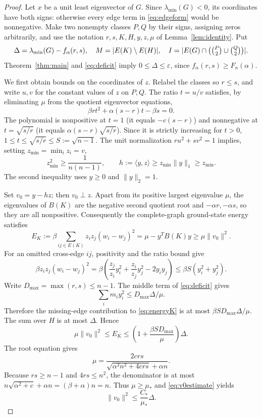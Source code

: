 \documentclass[11pt]{amsart}
\theoremstyle{definition}
\newcommand{\lam}{\lambda_{\min}}
\begin{document}
\begin{proof}
Let $x$ be a unit least eigenvector of $G$. Since $\lam(G)<0$, its coordinates have both signs: otherwise every edge term in \eqref{eq:edgeform} would be nonnegative. Make two nonempty classes $P,Q$ by their signs, assigning zeros arbitrarily, and use the notation $r,s,K,H,y,z,\mu$ of Lemma~\ref{lem:identity}. Put
\[
 \Delta=\lam(G)-f_\alpha(r,s),\quad
 M=|E(K)\setminus E(H)|,
 \quad I=|E(G)\cap\bigl(\tbinom P2\cup\tbinom Q2\bigr)|.
\]
Theorem~\ref{thm:main} and \eqref{eq:deficit} imply $0\le\Delta\le\varepsilon$, since $f_\alpha(r,s)\ge F_n(\alpha)$.

We first obtain bounds on the coordinates of $z$. Relabel the classes so $r\le s$, and write $u,v$ for the constant values of $z$ on $P,Q$. The ratio $t=u/v$ satisfies, by eliminating $\mu$ from the quotient eigenvector equations,
\[
 \beta rt^2+\alpha(s-r)t-\beta s=0.
\]
The polynomial is nonpositive at $t=1$ (it equals $-c(s-r)$) and nonnegative at $t=\sqrt{s/r}$ (it equals $\alpha(s-r)\sqrt{s/r}$). Since it is strictly increasing for $t>0$, $1\le t\le\sqrt{s/r}\le S:=\sqrt{n-1}$. The unit normalization $ru^2+sv^2=1$ implies, setting $z_{\min}=\min_i z_i=v$,
\begin{equation}\label{eq:zmin}
 z_{\min}^2\ge\frac1{n(n-1)},
 \qquad h:=\langle y,z\rangle\ge z_{\min}\|y\|_1\ge z_{\min}.
\end{equation}
The second inequality uses $y\ge0$ and $\|y\|_2=1$.

Set $v_0=y-hz$; then $v_0\perp z$. Apart from its positive largest eigenvalue $\mu$, the eigenvalues of $B(K)$ are the negative second quotient root and $-\alpha r,-\alpha s$, so they are all nonpositive. Consequently the complete-graph ground-state energy satisfies
\begin{equation}\label{eq:energyK}
 E_K:=\beta\sum_{ij\in E(K)}z_iz_j(w_i-w_j)^2
 =\mu-y^TB(K)y\ge\mu\|v_0\|^2.
\end{equation}
For an omitted cross-edge $ij$, positivity and the ratio bound give
\[
 \beta z_iz_j(w_i-w_j)^2
 =\beta\left(\frac{z_j}{z_i}y_i^2+\frac{z_i}{z_j}y_j^2-2y_iy_j\right)
 \le\beta S(y_i^2+y_j^2).
\]
Write $D_{\max}=\max(r,s)\le n-1$. The middle term of \eqref{eq:deficit} gives
\[\sum_i m_i y_i^2\le D_{\max}\Delta/\mu.\]
Therefore the missing-edge contribution to \eqref{eq:energyK} is at most
$\beta S D_{\max}\Delta/\mu$. The sum over $H$ is at most $\Delta$. Hence
\begin{equation}\label{eq:v0estimate}
 \mu\|v_0\|^2\le E_K\le
 \left(1+\frac{\beta SD_{\max}}\mu\right)\Delta.
\end{equation}
The root equation gives
\[
 \mu=\frac{2crs}{\sqrt{\alpha^2n^2+4crs}+\alpha n}.
\]
Because $rs\ge n-1$ and $4rs\le n^2$, the denominator is at most
$n\sqrt{\alpha^2+c}+\alpha n=(\beta+\alpha)n=n$. Thus $\mu\ge\mu_*$ and \eqref{eq:v0estimate} yields
\begin{equation}\label{eq:v0final}
 \|v_0\|^2\le\frac{C_*}{\mu_*}\Delta.
\end{equation}


\end{proof}
\end{document}
